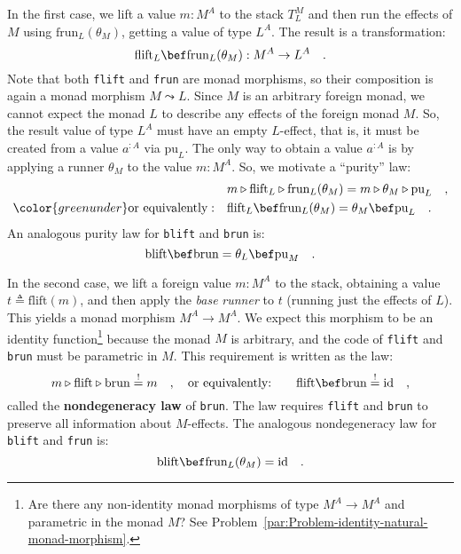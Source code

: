 In the first case, we lift a value $m:M^{A}$ to the stack $T_{L}^{M}$
and then run the effects of $M$ using $\text{frun}_{L}(\theta_{M})$,
getting a value of type $L^{A}$. The result is a transformation:
\[
\text{flift}_{L}\bef\text{frun}_{L}(\theta_{M}):M^{A}\rightarrow L^{A}\quad.
\]
Note that both \lstinline!flift! and \lstinline!frun! are monad
morphisms, so their composition is again a monad morphism $M\leadsto L$.
Since $M$ is an arbitrary foreign monad, we cannot expect the monad
$L$ to describe any effects of the foreign monad $M$. So, the result
value of type $L^{A}$ must have an empty $L$-effect, that is, it
must be created from a value $a^{:A}$ via $\text{pu}_{L}$. The only
way to obtain a value $a^{:A}$ is by applying a runner $\theta_{M}$
to the value $m:M^{A}$. So, we motivate a \textsf{``}purity\textsf{''} law:
\begin{align*}
 & m\triangleright\text{flift}_{L}\triangleright\text{frun}_{L}(\theta_{M})=m\triangleright\theta_{M}\triangleright\text{pu}_{L}\quad,\\
{\color{greenunder}\text{or equivalently}:}\quad & \text{flift}_{L}\bef\text{frun}_{L}(\theta_{M})=\theta_{M}\bef\text{pu}_{L}\quad.
\end{align*}
An analogous purity law
for \lstinline!blift! and \lstinline!brun! is:
\[
\text{blift}\bef\text{brun}=\theta_{L}\bef\text{pu}_{M}\quad.
\]

In the second case, we lift a foreign value $m:M^{A}$ to the stack,
obtaining a value $t\triangleq\text{flift}\left(m\right)$, and then
apply the \emph{base} \emph{runner} to $t$ (running just the effects
of $L$). This yields a monad morphism $M^{A}\rightarrow M^{A}$.
We expect this morphism to be an identity function\footnote{Are there any non-identity monad morphisms of type $M^{A}\rightarrow M^{A}$
and parametric in the monad $M$? See Problem~\ref{par:Problem-identity-natural-monad-morphism}.} because the monad $M$ is arbitrary, and the code of \lstinline!flift!
and \lstinline!brun! must be parametric in $M$. This requirement
is written as the law:
\[
m\triangleright\text{flift}\triangleright\text{brun}\overset{!}{=}m\quad,\quad\text{or equivalently:}\quad\quad\text{flift}\bef\text{brun}\overset{!}{=}\text{id}\quad,
\]
called the \textbf{nondegeneracy law}
of  \lstinline!brun!. The law requires \lstinline!flift! and \lstinline!brun!
to preserve all information about $M$-effects. The analogous nondegeneracy
law for \lstinline!blift! and \lstinline!frun! is:
\[
\text{blift}\bef\text{frun}_{L}(\theta_{M})=\text{id}\quad.
\]


